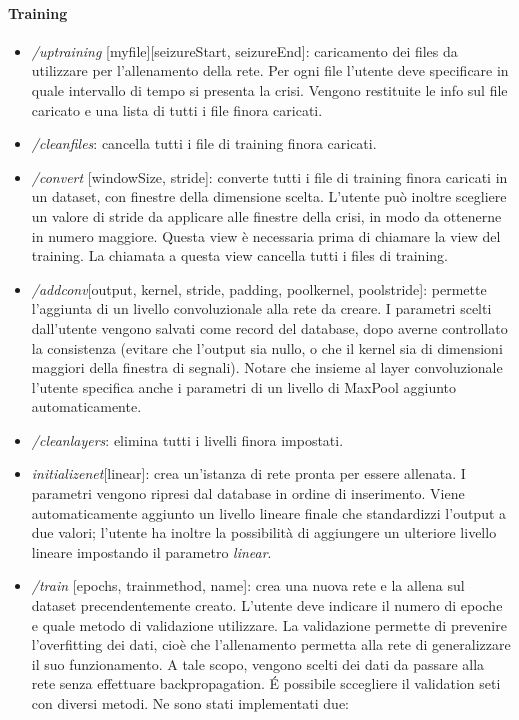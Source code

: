 \documentclass{article}
\begin{document}
\paragraph{Training}
\begin{itemize}
\item \textit{/uptraining} [myfile][seizureStart, seizureEnd]: caricamento dei files da utilizzare per l'allenamento della rete. Per ogni file l'utente deve specificare in quale intervallo di tempo si presenta la crisi. Vengono restituite le info sul file caricato e una lista di tutti i file finora caricati.
\item \textit{/cleanfiles}: cancella tutti i file di training finora caricati. 
\item \textit{/convert} [windowSize, stride]: converte tutti i file di training finora caricati in un dataset, con finestre della dimensione scelta. L'utente può inoltre scegliere un valore di stride da applicare alle finestre della crisi, in modo da ottenerne in numero maggiore. Questa view è necessaria prima di chiamare la view del training. La chiamata a questa view cancella tutti i files di training.
\item \textit{/addconv}[output, kernel, stride, padding, pool\textunderscore kernel, pool\textunderscore stride]: permette l'aggiunta di un livello convoluzionale alla rete da creare. I parametri scelti dall'utente vengono salvati come record del database, dopo averne controllato la consistenza (evitare che l'output sia nullo, o che il kernel sia di dimensioni maggiori della finestra di segnali). Notare che insieme al layer convoluzionale l'utente specifica anche i parametri di un livello di MaxPool aggiunto automaticamente.
\item \textit{/cleanlayers}: elimina tutti i livelli finora impostati.
\item \textit{initializenet}[linear]: crea un'istanza di rete pronta per essere allenata. I parametri vengono ripresi dal database in ordine di inserimento. Viene automaticamente aggiunto un livello lineare finale che standardizzi l'output a due valori; l'utente ha inoltre la possibilità di aggiungere un ulteriore livello lineare impostando il parametro \textit{linear}.
\item \textit{/train} [epochs, train\textunderscore method, name]: crea una nuova rete e la allena sul dataset precendentemente creato. L'utente deve indicare il numero di epoche e quale metodo di validazione utilizzare. La validazione permette di prevenire l'overfitting dei dati, cioè che l'allenamento permetta alla rete di generalizzare il suo funzionamento. A tale scopo, vengono scelti dei dati da passare alla rete senza effettuare backpropagation. \'E possibile sccegliere il validation seti con diversi metodi. Ne sono stati implementati due:

\end{itemize}
\end{document}
